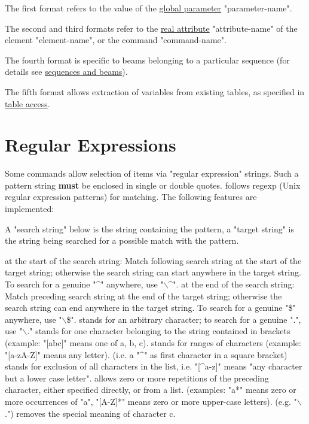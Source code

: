 The first format refers to the value of the \href{parameter.html}{global
  parameter} "parameter-name". 

The second and third formats refer to the
\href{real.html}{real attribute} "attribute-name" of the element
"element-name", or the command "command-name". 

The fourth format is specific
to beams belonging to a particular sequence (for details see
\href{sequence.html#beam}{sequences and beams}). 

The fifth format allows
extraction of variables from existing tables, as specified in
\href{expression.html#table}{table access}.  



%
\section{Regular Expressions}
\label{sec:regex}
Some commands allow selection of items via "regular expression"
strings. Such a pattern string \textbf{must} be enclosed in single or
double quotes. \madx follows regexp (Unix regular expression patterns)
for matching. The following features are implemented:  

A "search string" below is the string containing the pattern, a "target
string" is the string being searched for a possible match with the
pattern. 

\begin{madlist}
    at the start of the search string: Match
     following search string at the start of the target string;
     otherwise the search string can start anywhere in the target
     string. To search for a  genuine "\textasciicircum" anywhere, use
     "$\backslash$\textasciicircum".  
    at the end of the search string: Match preceding search
     string at the end of the target string; otherwise the search string
     can end anywhere in the target string. To search for a  genuine
     "\$" anywhere, use "$\backslash$\$".
    stands for an arbitrary character; to search for a genuine
     ".", use "$\backslash$."
    stands for one character belonging to the string
     contained in brackets (example: "[abc]" means one of a, b, c).  
    stands for ranges of characters (example:
     "[a-zA-Z]" means any letter).  
    (i.e. a "\textasciicircum" as first
     character in a square bracket) stands for exclusion of all
     characters in the list, i.e. "[\textasciicircum a-z]" means "any
     character but a lower case letter". 
    allows zero or more repetitions of the preceding
     character, either specified directly, or from a list. (examples:
     "a*" means zero or more occurrences of "a",  "[A-Z]*" means zero or
     more upper-case letters).  
     (e.g. "$\backslash$.") removes the special
     meaning of character c.  
\end{madlist}


